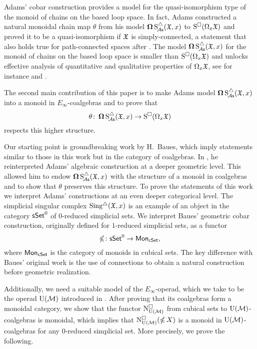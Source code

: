 Adams' cobar construction provides a model for the quasi-isomorphism type of the monoid of chains on the based loop space.
In fact, Adams constructed a natural monoidal chain map $\theta$ from his model $\operatorname{\mathbf{\Omega}} \operatorname{S^{\triangle}_{\!{\mathcal{A}\mathsf{s}}}}(\mathfrak{X}, x)$ to $\operatorname{S^{\square}}(\Omega_x \mathfrak{X})$ and proved it to be a quasi-isomorphism if $\mathfrak{X}$ is simply-connected, a statement that also holds true for path-connected spaces after \cite{rivera2018cubical}. The model $\operatorname{\mathbf{\Omega}} \operatorname{S^{\triangle}_{\!{\mathcal{A}\mathsf{s}}}}(\mathfrak{X}, x)$ for the monoid of chains on the based loop space is smaller than $\operatorname{S^{\square}}(\Omega_x \mathfrak{X})$ and unlocks effective analysis of quantitative and qualitative properties of $\Omega_x \mathfrak{X}$, see for instance \cite{chainalgebraloops} and \cite{adamscobarequivalence}.

The second main contribution of this paper is to make Adams model $\operatorname{\mathbf{\Omega}} \operatorname{S^{\triangle}_{\!{\mathcal{A}\mathsf{s}}}}(\mathfrak{X}, x)$ into a monoid in $E_\infty$-coalgebras and to prove that
\[
\theta \colon \operatorname{\mathbf{\Omega}} \operatorname{S^{\triangle}_{\!{\mathcal{A}\mathsf{s}}}}(\mathfrak{X}, x) \to \operatorname{S^{\square}}(\Omega_x \mathfrak{X})
\]
respects this higher structure.

Our starting point is groundbreaking work by H.~Baues, which imply statements similar to those in this work but in the category of coalgebras.
In \cite{baues1998hopf}, he reinterpreted Adams' algebraic construction at a deeper geometric level.
This allowed him to endow $\operatorname{\mathbf{\Omega}} \operatorname{S^{\triangle}_{\!{\mathcal{A}\mathsf{s}}}}(\mathfrak{X}, x)$ with the structure of a monoid in coalgebras and to show that $\theta$ preserves this structure.
To prove the statements of this work we interpret Adams' constructions at an even deeper categorical level.
The simplicial singular complex $\operatorname{Sing^{\triangle}}(\mathfrak{X}, x)$ is an example of an object in the category $\mathsf{sSet}^0$ of $0$-reduced simplicial sets.
We interpret Baues' geometric cobar construction, originally defined for $1$-reduced simplicial sets, as a functor
\begin{equation*}
	\operatorname{\mathbb{\Omega}} \colon \mathsf{sSet}^0 \to \mathsf{Mon}_{\mathsf{cSet}},
\end{equation*}
where $\mathsf{Mon}_{\mathsf{cSet}}$ is the category of monoids in cubical sets.
The key difference with Baues' original work is the use of connections to obtain a natural construction before geometric realization.

Additionally, we need a suitable model of the $E_\infty$-operad, which we take to be the operad ${\operatorname{U}(\mathcal{M})}$ introduced in \cite{medina2020prop1}.
After proving that its coalgebras form a monoidal category, we show that the functor $\operatorname{N^{\square}_{{\operatorname{U}(\mathcal{M})}}}$ from cubical sets to ${\operatorname{U}(\mathcal{M})}$-coalgebras is monoidal, which implies that $\operatorname{N^{\square}_{{\operatorname{U}(\mathcal{M})}}} (\operatorname{\mathbb{\Omega}} X)$ is a monoid in ${\operatorname{U}(\mathcal{M})}$-coalgebras for any 0-reduced simplicial set. More precisely, we prove the following.

